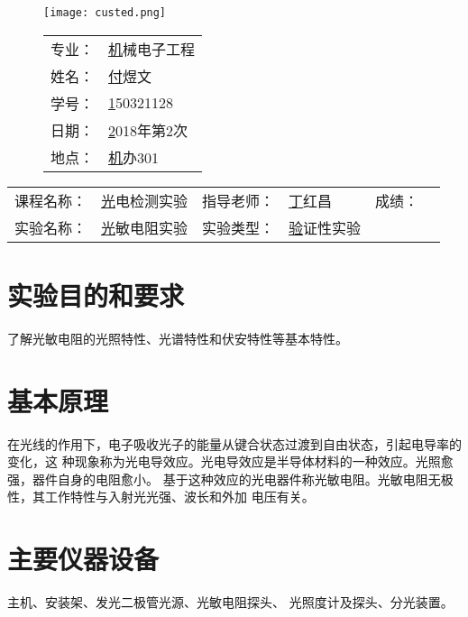 \documentclass{zjureport}
\makeatletter
\newcommand\dlmu[2][4cm]{\hskip1pt\underline{\hb@xt@ #1{\hss#2\hss}}\hskip3pt}
\newcommand{\major}{机械电子工程}
\newcommand{\name}{付煜文}
\newcommand{\stuid}{150321128}
\newcommand{\newdate}{2018年第2次}
\newcommand{\loc}{机办301}
\newcommand{\course}{光电检测实验}
\newcommand{\tutor}{丁红昌}
\newcommand{\newtitle}{光敏电阻实验}
\newcommand{\exptype}{验证性实验}
\makeatother
\begin{document}
		\thispagestyle{plain}         %
	\begin{figure}[h]
		\begin{minipage}{0.6\linewidth}
			\centerline{\texttt{[image: custed.png]}}
		\end{minipage}
		\hfill
		\begin{minipage}{.4\linewidth}
			\raggedleft
			\begin{tabular*}{.8\linewidth}{ll}
				专业： & \underline\major   \\
				姓名： & \underline\name    \\
				学号： & \underline\stuid   \\
				日期： & \underline\newdate \\
				地点： & \underline\loc
			\end{tabular*}
		\end{minipage}
	\end{figure}
	
	\begin{table}[!htbp]
		\centering
		\begin{tabular*}{\linewidth}{llllll}
			课程名称： & \underline\course   & 指导老师： & \underline\tutor   & 成绩：       &  \dlmu[1.5cm]{} \\
			实验名称： & \underline\newtitle & 实验类型： & \underline\exptype 
		\end{tabular*}
	\end{table}



\section{实验目的和要求}
	{了解光敏电阻的光照特性、光谱特性和伏安特性等基本特性。}
\section{基本原理}
	{
		在光线的作用下，电子吸收光子的能量从键合状态过渡到自由状态，引起电导率的变化，这
		种现象称为光电导效应。光电导效应是半导体材料的一种效应。光照愈强，器件自身的电阻愈小。
		基于这种效应的光电器件称光敏电阻。光敏电阻无极性，其工作特性与入射光光强、波长和外加
		电压有关。}


\section{主要仪器设备}
  {主机、安装架、发光二极管光源、光敏电阻探头、
  	光照度计及探头、分光装置。}
\end{document}

